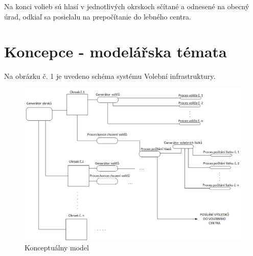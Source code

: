 \documentclass[12pt,a4paper,titlepage,final]{article}
\begin{document}
Na konci volieb sú hlasí v jednotlivých okrskoch sčítané a odnesené na obecný úrad, odkiaľ sa posielalu na prepočítanie do lebného centra.

  







\section{Koncepce - modelářska témata}
Na obrázku č. 1 je uvedeno schéma systému Volební infrastruktury.\newpage 
\begin{figure}[h]

\begin{center}

\includegraphics[scale=0.7]{img/konceptualni_model.eps} 
\caption{Konceptuálny model}
\label{koncept}

\end{center}

\end{figure}
\newpage
\end{document}

